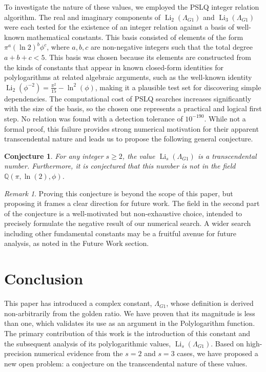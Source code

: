 \documentclass{amsart}
\theoremstyle{plain}
\newtheorem{conjecture}[theorem]{Conjecture}
\theoremstyle{definition}
\theoremstyle{remark}
\newtheorem*{remark}{Remark}
\DeclareMathOperator{\Li}{Li} %
\newcommand{\LambdaG}{\Lambda_{G1}}
\newcommand{\phiG}{\phi}
\begin{document}
To investigate the nature of these values, we employed the PSLQ integer relation algorithm. The real and imaginary components of $\Li_2(\LambdaG)$ and $\Li_3(\LambdaG)$ were each tested for the existence of an integer relation against a basis of well-known mathematical constants. This basis consisted of elements of the form $\pi^a (\ln 2)^b \phiG^c$, where $a,b,c$ are non-negative integers such that the total degree $a+b+c < 5$. This basis was chosen because its elements are constructed from the kinds of constants that appear in known closed-form identities for polylogarithms at related algebraic arguments, such as the well-known identity $\Li_2(\phiG^{-2})=\frac{\pi^{2}}{15}-\ln^{2}(\phiG)$, making it a plausible test set for discovering simple dependencies. The computational cost of PSLQ searches increases significantly with the size of the basis, so the chosen one represents a practical and logical first step. No relation was found with a detection tolerance of $10^{-190}$. While not a formal proof, this failure provides strong numerical motivation for their apparent transcendental nature and leads us to propose the following general conjecture.

\begin{conjecture}
For any integer $s \ge 2$, the value $\Li_s(\LambdaG)$ is a transcendental number. Furthermore, it is conjectured that this number is not in the field $\mathbb{Q}(\pi, \ln(2), \phiG)$.
\end{conjecture}
\begin{remark}
Proving this conjecture is beyond the scope of this paper, but proposing it frames a clear direction for future work. The field in the second part of the conjecture is a well-motivated but non-exhaustive choice, intended to precisely formulate the negative result of our numerical search. A wider search including other fundamental constants may be a fruitful avenue for future analysis, as noted in the Future Work section.
\end{remark}

\section{Conclusion}
This paper has introduced a complex constant, $\LambdaG$, whose definition is derived non-arbitrarily from the golden ratio. We have proven that its magnitude is less than one, which validates its use as an argument in the Polylogarithm function. The primary contribution of this work is the introduction of this constant and the subsequent analysis of its polylogarithmic values, $\Li_s(\LambdaG)$. Based on high-precision numerical evidence from the $s=2$ and $s=3$ cases, we have proposed a new open problem: a conjecture on the transcendental nature of these values.
\end{document}
